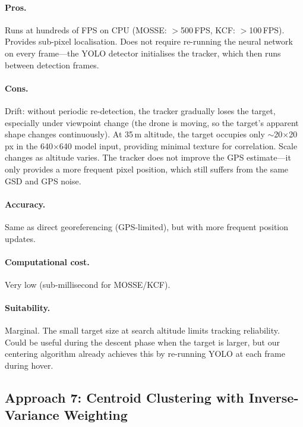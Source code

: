 \paragraph{Pros.}
Runs at hundreds of FPS on CPU (MOSSE: $>$500\,FPS, KCF: $>$100\,FPS).  Provides sub-pixel localisation.  Does not require re-running the neural network on every frame---the YOLO detector initialises the tracker, which then runs between detection frames.

\paragraph{Cons.}
Drift: without periodic re-detection, the tracker gradually loses the target, especially under viewpoint change (the drone is moving, so the target's apparent shape changes continuously).  At 35\,m altitude, the target occupies only $\sim$20$\times$20\,px in the 640$\times$640 model input, providing minimal texture for correlation.  Scale changes as altitude varies.  The tracker does not improve the GPS estimate---it only provides a more frequent pixel position, which still suffers from the same GSD and GPS noise.

\paragraph{Accuracy.}  Same as direct georeferencing (GPS-limited), but with more frequent position updates.

\paragraph{Computational cost.}  Very low (sub-millisecond for MOSSE/KCF).

\paragraph{Suitability.}  Marginal.  The small target size at search altitude limits tracking reliability.  Could be useful during the descent phase when the target is larger, but our centering algorithm already achieves this by re-running YOLO at each frame during hover.

\subsection{Approach 7: Centroid Clustering with Inverse-Variance Weighting}\label{sec:approach-clustering}

